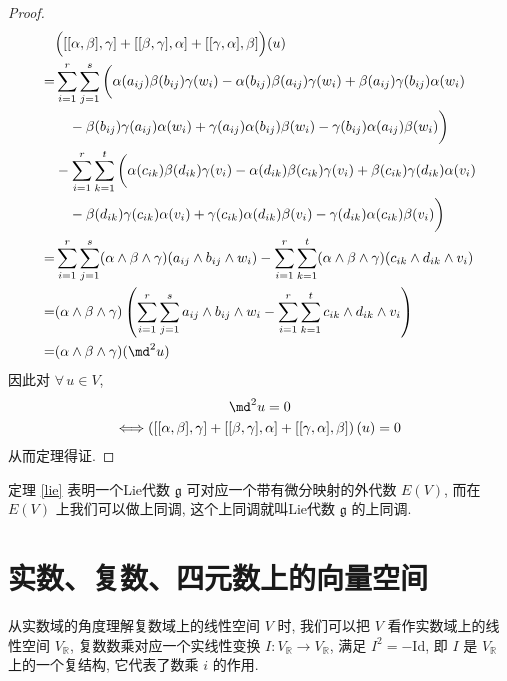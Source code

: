 \begin{proof}
\begin{align*}
            &\Big([[\alpha,\beta],\gamma]+[[\beta,\gamma],\alpha]+[[\gamma,\alpha],\beta]\Big)(u) \\
            =&\sum_{i=1}^{r}\sum_{j=1}^{s}\bigg(\alpha(a_{ij})\beta(b_{ij})\gamma(w_i)-\alpha(b_{ij})\beta(a_{ij})\gamma(w_i)+\beta(a_{ij})\gamma(b_{ij})\alpha(w_i) \\
            &\quad-\beta(b_{ij})\gamma(a_{ij})\alpha(w_i)+\gamma(a_{ij})\alpha(b_{ij})\beta(w_i)-\gamma(b_{ij})\alpha(a_{ij})\beta(w_i)\bigg) \\
            &-\sum_{i=1}^{r}\sum_{k=1}^{t}\bigg(\alpha(c_{ik})\beta(d_{ik})\gamma(v_i)-\alpha(d_{ik})\beta(c_{ik})\gamma(v_i)+\beta(c_{ik})\gamma(d_{ik})\alpha(v_i) \\
            &\quad-\beta(d_{ik})\gamma(c_{ik})\alpha(v_i)+\gamma(c_{ik})\alpha(d_{ik})\beta(v_i)-\gamma(d_{ik})\alpha(c_{ik})\beta(v_i)\bigg) \\
            =&\sum_{i=1}^{r}\sum_{j=1}^{s}(\alpha\wedge\beta\wedge\gamma)(a_{ij}\wedge b_{ij}\wedge w_i)-\sum_{i=1}^{r}\sum_{k=1}^{t}(\alpha\wedge\beta\wedge\gamma)(c_{ik}\wedge d_{ik}\wedge v_i) \\
            =&(\alpha\wedge\beta\wedge\gamma)\left(\sum_{i=1}^{r}\sum_{j=1}^{s}a_{ij}\wedge b_{ij}\wedge w_i-\sum_{i=1}^{r}\sum_{k=1}^{t}c_{ik}\wedge d_{ik}\wedge v_i\right) \\
            =&(\alpha\wedge\beta\wedge\gamma)(\md^2 u)
        \end{align*}
        因此对 $\forall\,u\in V$,
        \begin{gather*}
            \md^2 u = 0 \\
            \Longleftrightarrow \left([[\alpha,\beta],\gamma]+[[\beta,\gamma],\alpha]+[[\gamma,\alpha],\beta]\right)(u) = 0
        \end{gather*}
        从而定理得证.
    \end{proof}
    定理 \ref{lie} 表明一个{\rm Lie}代数 $\mathfrak{g}$ 可对应一个带有微分映射的外代数 $E(V)$, 而在 $E(V)$ 上我们可以做上同调,
    这个上同调就叫{\rm Lie}代数 $\mathfrak{g}$ 的上同调.

\section{实数、复数、四元数上的向量空间}

从实数域的角度理解复数域上的线性空间 $V$ 时, 我们可以把 $V$ 看作实数域上的线性空间 $V_{\mathbb{R}}$, 
复数数乘对应一个实线性变换 $I:V_{\mathbb{R}}\rightarrow V_{\mathbb{R}}$, 满足 $I^2 = -\mathrm{Id}$, 
即 $I$ 是 $V_{\mathbb{R}}$ 上的一个复结构, 它代表了数乘 $i$ 的作用. 

